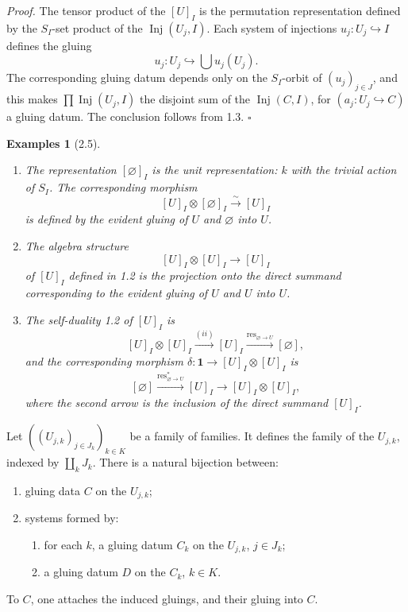 \documentclass[11pt]{article}
\newcommand{\Inj}{\operatorname{Inj}}
\newcommand{\res}{\operatorname{res}}
\newcommand{\xto}[1]{\xrightarrow{#1}}
\theoremstyle{deligne}
\newtheorem*{examples*}{Examples}
\newenvironment{proofdel}{\textit{Proof.}}{\hfill$\square$}
\newcommand{\para}[1]{\vspace{0.65em}\noindent{\bfseries #1}\quad}
\begin{document}
\begin{proofdel}
The tensor product of the \([U]_I\) is the permutation representation defined by the \(S_I\)-set product of the \(\Inj(U_j,I)\). Each system of injections \(u_j:U_j\hookrightarrow I\) defines the gluing
\[
  u_j:U_j\hookrightarrow \bigcup u_j(U_j).
\]
The corresponding gluing datum depends only on the \(S_I\)-orbit of \((u_j)_{j\in J}\), and this makes \(\prod \Inj(U_j,I)\) the disjoint sum of the \(\Inj(C,I)\), for \((a_j:U_j\hookrightarrow C)\) a gluing datum. The conclusion follows from 1.3.
\end{proofdel}

\begin{examples*}[2.5]
\begin{enumerate}[label=(\roman*)]
\item The representation \([\varnothing]_I\) is the unit representation: \(k\) with the trivial action of \(S_I\). The corresponding morphism
\[
  [U]_I\otimes[\varnothing]_I\overset{\sim}{\longrightarrow}[U]_I
\]
is defined by the evident gluing of \(U\) and \(\varnothing\) into \(U\).
\item The algebra structure
\[
  [U]_I\otimes[U]_I\longrightarrow[U]_I
\]
of \([U]_I\) defined in 1.2 is the projection onto the direct summand corresponding to the evident gluing of \(U\) and \(U\) into \(U\).
\item The self-duality 1.2 of \([U]_I\) is
\[
  [U]_I\otimes[U]_I \xto{(ii)} [U]_I \xto{\res_{\varnothing\to U}} [\varnothing],
\]
and the corresponding morphism \(\delta:\mathbf 1\to[U]_I\otimes[U]_I\) is
\[
  [\varnothing]\xto{\res_{\varnothing\to U}^*}[U]_I
  \longrightarrow [U]_I\otimes[U]_I,
\]
where the second arrow is the inclusion of the direct summand \([U]_I\).
\end{enumerate}
\end{examples*}

\para{2.6.}
Let \(((U_{j,k})_{j\in J_k})_{k\in K}\) be a family of families. It defines the family of the \(U_{j,k}\), indexed by \(\coprod_k J_k\). There is a natural bijection between:
\begin{enumerate}[label=(\Alph*)]
\item gluing data \(C\) on the \(U_{j,k}\);
\item systems formed by:
\begin{enumerate}[label=(\alph*)]
\item for each \(k\), a gluing datum \(C_k\) on the \(U_{j,k}\), \(j\in J_k\);
\item a gluing datum \(D\) on the \(C_k\), \(k\in K\).
\end{enumerate}
\end{enumerate}
To \(C\), one attaches the induced gluings, and their gluing into \(C\).
\end{document}
